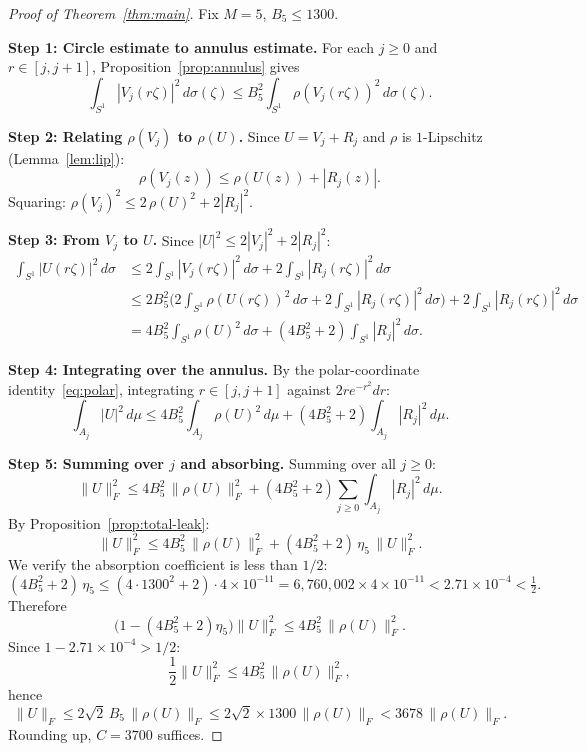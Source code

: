 \documentclass[11pt]{article}
\newcommand{\rhof}{\rho}
\newcommand{\norm}[1]{\lVert #1\rVert}
\begin{document}
\begin{proof}[Proof of Theorem~\ref{thm:main}]
Fix $M = 5$, $B_5 \le 1300$.

\medskip\noindent\textbf{Step 1: Circle estimate to annulus estimate.}
For each $j \ge 0$ and $r \in [j,j+1]$, Proposition~\ref{prop:annulus} gives
\[
  \int_{S^1}|V_j(r\zeta)|^2\,d\sigma(\zeta)
  \le B_5^2\int_{S^1}\rhof(V_j(r\zeta))^2\,d\sigma(\zeta).
\]

\medskip\noindent\textbf{Step 2: Relating $\rhof(V_j)$ to $\rhof(U)$.}
Since $U = V_j + R_j$ and $\rhof$ is $1$-Lipschitz (Lemma~\ref{lem:lip}):
\[
  \rhof(V_j(z)) \le \rhof(U(z)) + |R_j(z)|.
\]
Squaring: $\rhof(V_j)^2 \le 2\,\rhof(U)^2 + 2|R_j|^2$.

\medskip\noindent\textbf{Step 3: From $V_j$ to $U$.}
Since $|U|^2 \le 2|V_j|^2 + 2|R_j|^2$:
\begin{align*}
  \int_{S^1}|U(r\zeta)|^2\,d\sigma
  &\le 2\int_{S^1}|V_j(r\zeta)|^2\,d\sigma + 2\int_{S^1}|R_j(r\zeta)|^2\,d\sigma \\
  &\le 2B_5^2\bigl(2\int_{S^1}\rhof(U(r\zeta))^2\,d\sigma
    + 2\int_{S^1}|R_j(r\zeta)|^2\,d\sigma\bigr) + 2\int_{S^1}|R_j(r\zeta)|^2\,d\sigma \\
  &= 4B_5^2\int_{S^1}\rhof(U)^2\,d\sigma + (4B_5^2+2)\int_{S^1}|R_j|^2\,d\sigma.
\end{align*}

\medskip\noindent\textbf{Step 4: Integrating over the annulus.}
By the polar-coordinate identity~\eqref{eq:polar}, integrating
$r \in [j,j+1]$ against $2re^{-r^2}dr$:
\[
  \int_{A_j}|U|^2\,d\mu
  \le 4B_5^2\int_{A_j}\rhof(U)^2\,d\mu + (4B_5^2+2)\int_{A_j}|R_j|^2\,d\mu.
\]

\medskip\noindent\textbf{Step 5: Summing over $j$ and absorbing.}
Summing over all $j \ge 0$:
\[
  \norm{U}_F^2
  \le 4B_5^2\,\norm{\rhof(U)}_F^2 + (4B_5^2+2)\sum_{j\ge 0}\int_{A_j}|R_j|^2\,d\mu.
\]
By Proposition~\ref{prop:total-leak}:
\[
  \norm{U}_F^2 \le 4B_5^2\,\norm{\rhof(U)}_F^2 + (4B_5^2+2)\,\eta_5\,\norm{U}_F^2.
\]
We verify the absorption coefficient is less than $1/2$:
\[
  (4B_5^2+2)\,\eta_5
  \le (4\cdot 1300^2+2)\cdot 4\times 10^{-11}
  = 6{,}760{,}002 \times 4\times 10^{-11}
  < 2.71\times 10^{-4}
  < \tfrac{1}{2}.
\]
Therefore
\[
  \bigl(1 - (4B_5^2+2)\eta_5\bigr)\norm{U}_F^2 \le 4B_5^2\,\norm{\rhof(U)}_F^2.
\]
Since $1 - 2.71\times10^{-4} > 1/2$:
\[
  \frac{1}{2}\norm{U}_F^2 \le 4B_5^2\,\norm{\rhof(U)}_F^2,
\]
hence
\[
  \norm{U}_F \le 2\sqrt{2}\,B_5\,\norm{\rhof(U)}_F
  \le 2\sqrt{2}\times 1300\,\norm{\rhof(U)}_F
  < 3678\,\norm{\rhof(U)}_F.
\]
Rounding up, $C = 3700$ suffices.
\end{proof}
\end{document}
